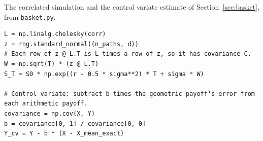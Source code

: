 \documentclass[11pt,a4paper]{article}
\begin{document}
The correlated simulation and the control variate estimate of Section~\ref{sec:basket}, from \texttt{basket.py}.

\begin{lstlisting}
L = np.linalg.cholesky(corr)
z = rng.standard_normal((n_paths, d))
# Each row of z @ L.T is L times a row of z, so it has covariance C.
W = np.sqrt(T) * (z @ L.T)
S_T = S0 * np.exp((r - 0.5 * sigma**2) * T + sigma * W)

# Control variate: subtract b times the geometric payoff's error from each arithmetic payoff.
covariance = np.cov(X, Y)
b = covariance[0, 1] / covariance[0, 0]
Y_cv = Y - b * (X - X_mean_exact)
\end{lstlisting}
\end{document}

